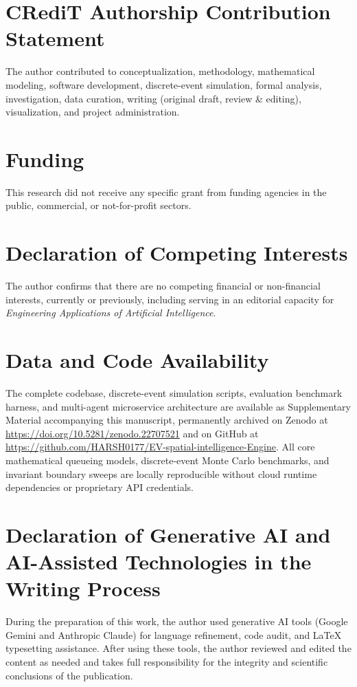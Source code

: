 \documentclass[preprint,12pt,authoryear]{elsarticle}
\begin{document}
\section*{CRediT Authorship Contribution Statement}
The author contributed to conceptualization, methodology, mathematical modeling, software development, discrete-event simulation, formal analysis, investigation, data curation, writing (original draft, review \& editing), visualization, and project administration.

\section*{Funding}
This research did not receive any specific grant from funding agencies in the public, commercial, or not-for-profit sectors.

\section*{Declaration of Competing Interests}
The author confirms that there are no competing financial or non-financial interests, currently or previously, including serving in an editorial capacity for \textit{Engineering Applications of Artificial Intelligence}.

\section*{Data and Code Availability}
The complete codebase, discrete-event simulation scripts, evaluation benchmark harness, and multi-agent microservice architecture are available as Supplementary Material accompanying this manuscript, permanently archived on Zenodo at \url{https://doi.org/10.5281/zenodo.22707521} and on GitHub at \url{https://github.com/HARSH0177/EV-spatial-intelligence-Engine}. All core mathematical queueing models, discrete-event Monte Carlo benchmarks, and invariant boundary sweeps are locally reproducible without cloud runtime dependencies or proprietary API credentials.

\section*{Declaration of Generative AI and AI-Assisted Technologies in the Writing Process}
During the preparation of this work, the author used generative AI tools (Google Gemini and Anthropic Claude) for language refinement, code audit, and LaTeX typesetting assistance. After using these tools, the author reviewed and edited the content as needed and takes full responsibility for the integrity and scientific conclusions of the publication.



\end{document}
